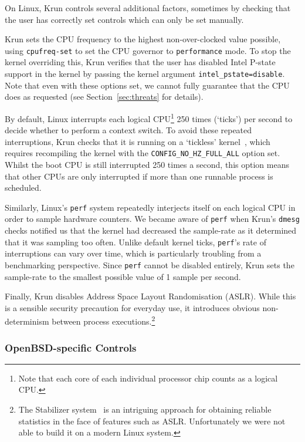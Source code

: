 \documentclass[preprint,numbers,10pt]{sigplanconf}
\newcommand{\krun}{Krun\xspace}
\begin{document}
On Linux, \krun controls several additional factors, sometimes by checking that
the user has correctly set controls which can only be set manually.

\krun sets the CPU frequency to the highest non-over-clocked value possible,
using \texttt{cpufreq-set} to set the CPU governor to \texttt{performance} mode.
To stop the kernel overriding this, \krun verifies that the user has disabled
Intel P-state support in the kernel by passing the kernel argument
\texttt{intel\_pstate=disable}. Note that even with these options set, we cannot
fully guarantee that the CPU does as requested
(see Section~\ref{sec:threats} for details).

By default, Linux interrupts each logical CPU\footnote{Note that each core of
each individual processor chip counts as a logical CPU.} 250 times (`ticks') per second to
decide whether to perform a context switch. To avoid these repeated
interruptions, \krun checks that it is running on a `tickless'
kernel~\cite{tickless}, which requires recompiling the kernel with the
\texttt{CONFIG\_NO\_HZ\_FULL\_ALL} option set. Whilst the boot CPU is still
interrupted 250 times a second, this option means that other CPUs are only
interrupted if more than one runnable process is scheduled.

Similarly, Linux's \texttt{perf} system repeatedly interjects itself  on each logical CPU in order to sample hardware counters. We became
aware of \texttt{perf} when \krun's \texttt{dmesg} checks notified us that the
kernel had decreased the sample-rate as it determined that it was sampling too
often. Unlike default kernel ticks, \texttt{perf}'s rate of interruptions can
vary over time, which is particularly troubling from a benchmarking perspective.
Since \texttt{perf} cannot be disabled entirely,
\krun sets the sample-rate to the smallest possible value of 1 sample per
second.

Finally, \krun disables Address Space Layout Randomisation (ASLR). While this is
a sensible security precaution for everyday use, it introduces obvious
non-determinism between process executions.\footnote{The Stabilizer
system~\cite{curtsinger13stabilizer} is an intriguing approach for obtaining reliable
statistics in the face of features such as ASLR. Unfortunately we were not able
to build it on a modern Linux system.}


\subsubsection{OpenBSD-specific Controls}
\end{document}
